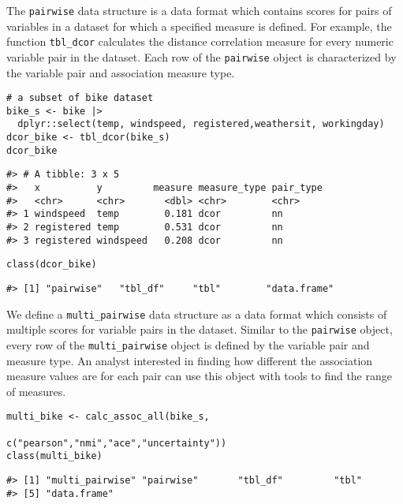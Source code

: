 The \texttt{pairwise} data structure is a data format which contains scores for pairs of variables in a dataset for which a specified measure is defined. For example, the function \texttt{tbl\_dcor} calculates the distance correlation measure for every numeric variable pair in the dataset. Each row of the \texttt{pairwise} object is characterized by the variable pair and association measure type.

\begin{verbatim}
# a subset of bike dataset
bike_s <- bike |> 
  dplyr::select(temp, windspeed, registered,weathersit, workingday)
dcor_bike <- tbl_dcor(bike_s)
dcor_bike
\end{verbatim}

\begin{verbatim}
#> # A tibble: 3 x 5
#>   x          y         measure measure_type pair_type
#>   <chr>      <chr>       <dbl> <chr>        <chr>    
#> 1 windspeed  temp        0.181 dcor         nn       
#> 2 registered temp        0.531 dcor         nn       
#> 3 registered windspeed   0.208 dcor         nn
\end{verbatim}

\begin{verbatim}
class(dcor_bike)
\end{verbatim}

\begin{verbatim}
#> [1] "pairwise"   "tbl_df"     "tbl"        "data.frame"
\end{verbatim}

We define a \texttt{multi\_pairwise} data structure as a data format which consists of multiple scores for variable pairs in the dataset. Similar to the \texttt{pairwise} object, every row of the \texttt{multi\_pairwise} object is defined by the variable pair and measure type. An analyst interested in finding how different the association measure values are for each pair can use this object with  tools to find the range of measures.

\begin{verbatim}
multi_bike <- calc_assoc_all(bike_s,
                                 c("pearson","nmi","ace","uncertainty"))
class(multi_bike)
\end{verbatim}

\begin{verbatim}
#> [1] "multi_pairwise" "pairwise"       "tbl_df"         "tbl"           
#> [5] "data.frame"
\end{verbatim}


